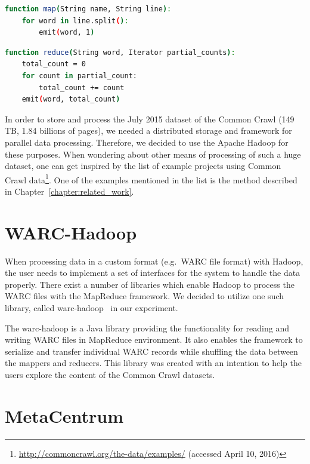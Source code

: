 \begin{lstlisting}[float=htb!,language=bash,caption={WordCount: map},label={listing:wordcount_map}]
function map(String name, String line):
	for word in line.split():
		emit(word, 1)
\end{lstlisting}

\begin{lstlisting}[float=htb!,language=bash,caption={WordCount: reduce},label={listing:wordcount_reduce}]
function reduce(String word, Iterator partial_counts):
	total_count = 0
	for count in partial_count:
		total_count += count
	emit(word, total_count)
\end{lstlisting}

In order to store and process the July 2015 dataset of the Common Crawl (149 TB, 1.84 billions of pages), we needed a distributed storage and framework for parallel data processing. Therefore, we decided to use the Apache Hadoop for these purposes. When wondering about other means of processing of such a huge dataset, one can get inspired by the list of example projects using Common Crawl data\footnote{\url{http://commoncrawl.org/the-data/examples/} (accessed April 10, 2016)}. One of the examples mentioned in the list is the method described in Chapter~\ref{chapter:related_work}.

\section{WARC-Hadoop}
\label{section:warc_hadoop}

When processing data in a custom format (e.g.\ WARC file format) with Hadoop, the user needs to implement a set of interfaces for the system to handle the data properly. There exist a number of libraries which enable Hadoop to process the WARC files with the MapReduce framework. We decided to utilize one such library, called warc-hadoop~\cite{warc-hadoop} in our experiment.

The warc-hadoop is a Java library providing the functionality for reading and writing WARC files in MapReduce environment. It also enables the framework to serialize and transfer individual WARC records while shuffling the data between the mappers and reducers. This library was created with an intention to help the users explore the content of the Common Crawl datasets.

\section{MetaCentrum}
\label{section:metacentrum}

